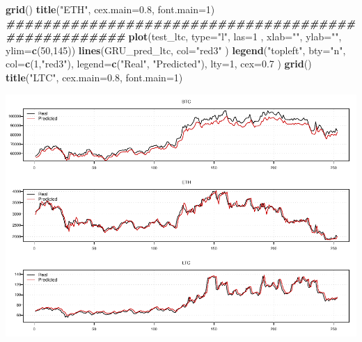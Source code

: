 \documentclass[
]{article}
\newenvironment{Shaded}{\begin{snugshade}}{\end{snugshade}}
\newcommand{\AttributeTok}[1]{\textcolor[rgb]{0.13,0.29,0.53}{#1}}
\newcommand{\DecValTok}[1]{\textcolor[rgb]{0.00,0.00,0.81}{#1}}
\newcommand{\DocumentationTok}[1]{\textcolor[rgb]{0.56,0.35,0.01}{\textbf{\textit{#1}}}}
\newcommand{\FloatTok}[1]{\textcolor[rgb]{0.00,0.00,0.81}{#1}}
\newcommand{\FunctionTok}[1]{\textcolor[rgb]{0.13,0.29,0.53}{\textbf{#1}}}
\newcommand{\NormalTok}[1]{#1}
\newcommand{\StringTok}[1]{\textcolor[rgb]{0.31,0.60,0.02}{#1}}
\begin{document}
\begin{Shaded}
\begin{Highlighting}[]
\FunctionTok{grid}\NormalTok{()}
\FunctionTok{title}\NormalTok{(}\StringTok{"ETH"}\NormalTok{, }\AttributeTok{cex.main=}\FloatTok{0.8}\NormalTok{, }\AttributeTok{font.main=}\DecValTok{1}\NormalTok{)}
\DocumentationTok{\#\#\#\#\#\#\#\#\#\#\#\#\#\#\#\#\#\#\#\#\#\#\#\#\#\#\#\#\#\#\#\#\#\#\#\#\#\#\#\#\#\#\#\#\#\#\#\#\#\#\#}
\FunctionTok{plot}\NormalTok{(test\_ltc, }\AttributeTok{type=}\StringTok{"l"}\NormalTok{, }\AttributeTok{las=}\DecValTok{1}\NormalTok{ , }\AttributeTok{xlab=}\StringTok{""}\NormalTok{, }\AttributeTok{ylab=}\StringTok{""}\NormalTok{, }\AttributeTok{ylim=}\FunctionTok{c}\NormalTok{(}\DecValTok{50}\NormalTok{,}\DecValTok{145}\NormalTok{))}
\FunctionTok{lines}\NormalTok{(GRU\_pred\_ltc, }\AttributeTok{col=}\StringTok{"red3"}\NormalTok{ )}
\FunctionTok{legend}\NormalTok{(}\StringTok{"topleft"}\NormalTok{, }\AttributeTok{bty=}\StringTok{"n"}\NormalTok{, }\AttributeTok{col=}\FunctionTok{c}\NormalTok{(}\DecValTok{1}\NormalTok{,}\StringTok{"red3"}\NormalTok{), }\AttributeTok{legend=}\FunctionTok{c}\NormalTok{(}\StringTok{"Real"}\NormalTok{, }\StringTok{"Predicted"}\NormalTok{), }\AttributeTok{lty=}\DecValTok{1}\NormalTok{, }\AttributeTok{cex=}\FloatTok{0.7}\NormalTok{ )}
\FunctionTok{grid}\NormalTok{()}
\FunctionTok{title}\NormalTok{(}\StringTok{"LTC"}\NormalTok{, }\AttributeTok{cex.main=}\FloatTok{0.8}\NormalTok{, }\AttributeTok{font.main=}\DecValTok{1}\NormalTok{)}
\end{Highlighting}
\end{Shaded}

\includegraphics{SoftwareCode_files/figure-latex/unnamed-chunk-18-2.pdf}
\end{document}

